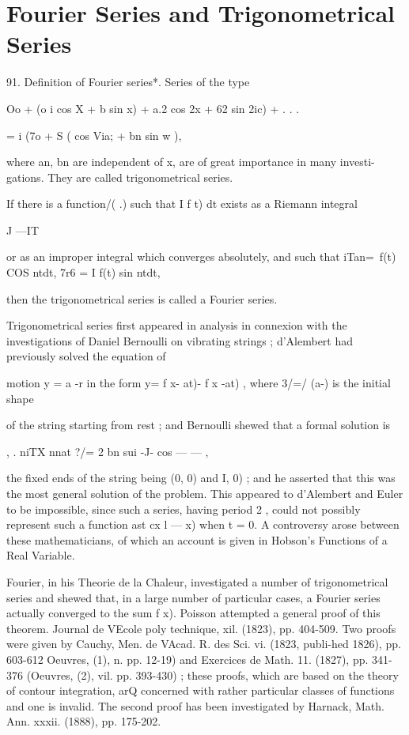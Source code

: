 \chapter{Fourier Series and Trigonometrical Series} 

91. Definition of Fourier series*. Series of the type

 Oo + (o i cos X + b sin x) + a.2 cos 2x + 62 sin 2ic) + . . .

= i (7o + S ( cos Via; + bn sin w ),

where an, bn are independent of x, are of great importance in many
investi- gations. They are called trigonometrical series.

If there is a function/( .) such that I f t) dt exists as a Riemann
integral

J —IT

or as an improper integral which converges absolutely, and such that
iTan=\ f(t) COS ntdt, 7r6 = I f(t) sin ntdt,

then the trigonometrical series is called a Fourier series.

Trigonometrical series first appeared in analysis in connexion with
the investigations of Daniel Bernoulli on vibrating strings ;
d'Alembert had previously solved the equation of

motion y = a -r in the form y= f x- at)- f x -at) , where 3/=/ (a-) is
the initial shape

of the string starting from rest ; and Bernoulli shewed that a formal
solution is

  , . niTX nnat ?/= 2 bn sui -J- cos — — ,

the fixed ends of the string being (0, 0) and I, 0) ; and he asserted
that this was the most general solution of the problem. This appeared
to d'Alembert and Euler to be impossible, since such a series, having
period 2 , could not possibly represent such a function ast cx l — x)
when t = 0. A controversy arose between these mathematicians, of which
an account is given in Hobson's Functions of a Real Variable.

Fourier, in his Theorie de la Chaleur, investigated a number of
trigonometrical series and shewed that, in a large number of
particular cases, a Fourier series actually converged to the sum f x).
Poisson attempted a general proof of this theorem. Journal de VEcole
poly technique, xil. (1823), pp. 404-509. Two proofs were given by
Cauchy, Men. de VAcad. R. des Sci. vi. (1823, publi-hed 1826), pp.
603-612 Oeuvres, (1), n. pp. 12-19) and Exercices de Math. 11. (1827),
pp. 341-376 (Oeuvres, (2), vil. pp. 393-430) ; these proofs, which are
based on the theory of contour integration, arQ concerned with rather
particular classes of functions and one is invalid. The second proof
has been investigated by Harnack, Math. Ann. xxxii. (1888), pp.
175-202.

